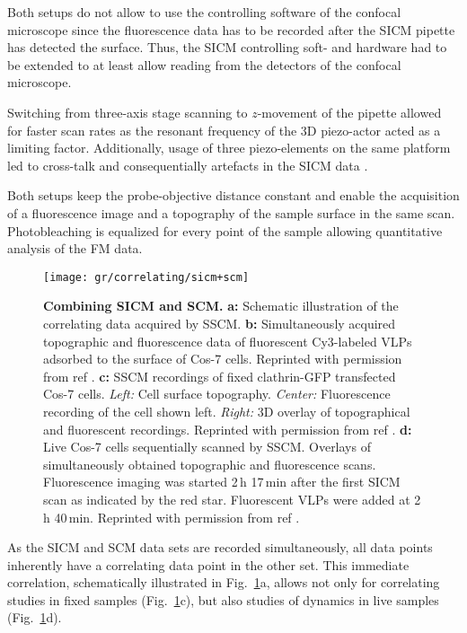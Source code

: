 Both setups do not allow to use the controlling software of the confocal
microscope since the fluorescence data has to be recorded after the SICM
pipette has detected the surface. Thus, the SICM controlling soft- and
hardware had to be extended to at least allow reading from the detectors of
the confocal microscope. 

Switching from three-axis stage scanning to $z$-movement of the pipette
allowed for faster scan rates as the resonant frequency of the 3D
piezo-actor acted as a limiting factor. Additionally, usage of three
piezo-elements on the same platform led to cross-talk and consequentially
artefacts in the SICM data \cite{Shevchuk2013}.



Both setups keep the probe-objective distance constant and enable the
acquisition of a fluorescence image and a topography of the sample surface in
the same scan. Photobleaching is equalized for every point of the sample
allowing quantitative analysis of the FM data.

\begin{figure}
  \texttt{[image: gr/correlating/sicm+scm]}
  \caption{%
    \textbf{Combining SICM and SCM.}
    \textbf{a:} Schematic illustration of the correlating data acquired by SSCM.
    \textbf{b:} Simultaneously acquired topographic and fluorescence data of fluorescent Cy3-labeled 
    VLPs adsorbed to the surface of Cos-7 cells. Reprinted with permission from ref \cite{Gorelik2002a}.
    \textbf{c:} SSCM recordings of fixed clathrin-GFP transfected Cos-7 cells. 
    	\textit{Left:} Cell surface topography. 
    	\textit{Center:} Fluorescence recording of the cell shown left. 
    	\textit{Right:} 3D overlay of topographical and fluorescent recordings. 
    Reprinted with permission from ref \cite{Shevchuk2008}.
    \textbf{d:} Live Cos-7 cells sequentially scanned by SSCM. Overlays of simultaneously obtained 
    topographic and fluorescence scans. Fluorescence imaging was started 2\,h 17\,min after the first 
    SICM scan as indicated by the red star. Fluorescent VLPs were added at 2\,h 40\,min. 
    Reprinted with permission from ref \cite{Gorelik2002}.
  }
  \label{fig:sicm+scm}
\end{figure}

As the SICM and SCM data sets are recorded simultaneously, all data points inherently have a
correlating data point in the other set. This immediate correlation, schematically illustrated in
Fig.~\ref{fig:sicm+scm}a, allows not only for correlating studies in fixed
samples (Fig.~\ref{fig:sicm+scm}c), but also studies of dynamics in live
samples (Fig.~\ref{fig:sicm+scm}d).



